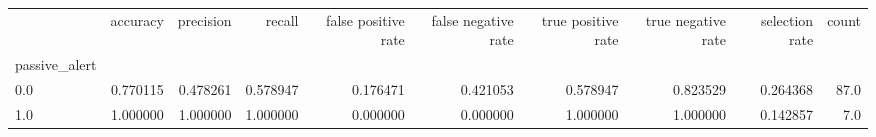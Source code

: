 \begin{tabular}{lrrrrrrrrr}
\toprule
{} &  accuracy &  precision &    recall &  false positive rate &  false negative rate &  true positive rate &  true negative rate &  selection rate &  count \\
passive\_alert &           &            &           &                      &                      &                     &                     &                 &        \\
\midrule
0.0           &  0.770115 &   0.478261 &  0.578947 &             0.176471 &             0.421053 &            0.578947 &            0.823529 &        0.264368 &   87.0 \\
1.0           &  1.000000 &   1.000000 &  1.000000 &             0.000000 &             0.000000 &            1.000000 &            1.000000 &        0.142857 &    7.0 \\
\bottomrule
\end{tabular}
